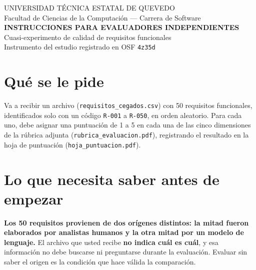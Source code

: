 \documentclass[11pt,a4paper]{article}
\begin{document}
\begin{center}
{\footnotesize UNIVERSIDAD TÉCNICA ESTATAL DE QUEVEDO\\
Facultad de Ciencias de la Computación --- Carrera de Software}\\[10pt]
{\Large\bfseries\color{uteqverde} INSTRUCCIONES PARA EVALUADORES INDEPENDIENTES}\\[3pt]
{\large Cuasi-experimento de calidad de requisitos funcionales}\\[2pt]
{\footnotesize Instrumento del estudio registrado en OSF \texttt{4z35d}}
\end{center}

\vspace{6pt}

\section{Qué se le pide}

Va a recibir un archivo (\texttt{requisitos\_cegados.csv}) con 50 requisitos
funcionales, identificados solo con un código \texttt{R-001} a
\texttt{R-050}, en orden aleatorio. Para cada uno, debe asignar una
puntuación de 1 a 5 en cada una de las cinco dimensiones de la rúbrica
adjunta (\texttt{rubrica\_evaluacion.pdf}), registrando el resultado en la
hoja de puntuación (\texttt{hoja\_puntuacion.pdf}).

\section{Lo que necesita saber antes de empezar}

\begin{tcolorbox}[colback=grisclaro, colframe=uteqverde, boxrule=0.6pt]
\textbf{Los 50 requisitos provienen de dos orígenes distintos: la mitad
fueron elaborados por analistas humanos y la otra mitad por un modelo de
lenguaje.} El archivo que usted recibe \textbf{no indica cuál es cuál}, y
esa información no debe buscarse ni preguntarse durante la evaluación.
Evaluar sin saber el origen es la condición que hace válida la
comparación.
\end{tcolorbox}
\end{document}
